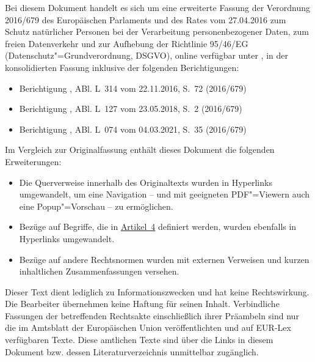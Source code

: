 
Bei diesem Dokument handelt es sich um eine erweiterte Fassung der Verordnung 2016/679 des Europäischen Parlaments und
des Rates vom 27.04.2016 zum Schutz natürlicher Personen bei der Verarbeitung personenbezogener Daten, zum freien
Datenverkehr und zur Aufhebung der Richtlinie 95/46/EG (Datenschutz"=Grundverordnung, DSGVO), online verfügbar unter 
\cite{dsgvo-original}, in der konsolidierten Fassung inklusive der folgenden Berichtigungen:

\begin{itemize}
  \item Berichtigung \cite{dsgvo-korr-2016}, ABl. L~314 vom 22.11.2016, S.~72 (2016/679)
  \item Berichtigung \cite{dsgvo-korr-2018}, ABl. L~127 vom 23.05.2018, S.~2 (2016/679)
  \item Berichtigung \cite{dsgvo-korr-2021}, ABl. L~074 vom 04.03.2021, S.~35 (2016/679)
\end{itemize}

Im Vergleich zur Originalfassung enthält dieses Dokument die folgenden Erweiterungen:

\begin{itemize}

  \item Die Querverweise innerhalb des Originaltexts wurden in Hyperlinks umgewandelt, um eine Navigation -- und
   mit geeigneten PDF"=Viewern auch eine Popup"=Vorschau -- zu ermöglichen.

  \item Bezüge auf Begriffe, die in \hyperref[ch:4]{Artikel~4} definiert werden, wurden ebenfalls in Hyperlinks
   umgewandelt.

  \item Bezüge auf andere Rechtsnormen wurden mit externen Verweisen und kurzen inhaltlichen Zusammenfassungen versehen.

\end{itemize}

Dieser Text dient lediglich zu Informationszwecken und hat keine Rechtswirkung. Die Bearbeiter übernehmen keine Haftung
für seinen Inhalt. Verbindliche Fassungen der betreffenden Rechtsakte einschließlich ihrer Präambeln sind nur die im
Amtsblatt der Europäischen Union veröffentlichten und auf EUR-Lex verfügbaren Texte. Diese amtlichen Texte sind über
die Links in diesem Dokument bzw. dessen Literaturverzeichnis unmittelbar zugänglich.